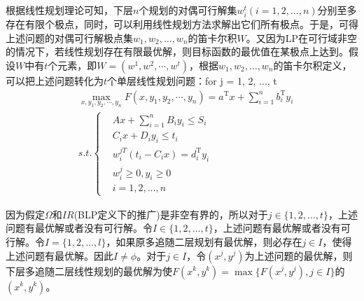     \par
    根据线性规划理论可知，下层$n$个规划的对偶可行解集$w_i^t (i=1,2,\ldots,n)$分别至多存在有限个极点，同时，可以利用线性规划方法求解出它们所有极点。于是，可得上述问题的对偶可行解极点集$w_1,w_2,\ldots,w_n$的笛卡尔积$W$。又因为LP在可行域非空的情况下，若线性规划存在有限最优解，则目标函数的最优值在某极点上达到。假设$W$中有$t$个元素，即$W=(w^1,w^2,\cdots,w^t )$，根据$w_1,w_2,\ldots,w_n$的笛卡尔积定义，可以把上述问题转化为$t$个单层线性规划问题：for j = 1, 2, ..., t
    \begin{align*}
        &\mathop{\max}\limits_{x,y_1,y_2,\cdots,y_n} F(x,y_1,y_2,\cdots,y_n)=a^\mathrm{T} x+\mathop{\sum}\limits_{i=1}^nb_i^\mathrm{T} y_i\\
        & s.t.\left\{
        \begin{aligned}
        & Ax+\mathop{\sum}\limits_{i=1}^nB_iy_i\leqslant S_i\\
        & C_ix+D_iy_i\leqslant t_i\\
        & w_i^{jT}(t_i-C_ix) = d_i^\mathrm{T} y_i\\
        & w_i^j \geqslant 0,y_i \geqslant 0\\
        & i=1,2,\ldots,n
        \end{aligned}
            \right.
    \end{align*}
    \par
    因为假定$\Omega$和$IR$(BLP定义下的推广)是非空有界的，所以对于$j\in \{1,2,\ldots,t\}$，上述问题有最优解或者没有可行解。令$I\in \{1,2,\ldots ,t\}$，上述问题有最优解或者没有可行解。令$I=\{1,2,\ldots ,l\}$，如果原多追随二层规划有最优解，则必存在$j \in I$，使得上述问题有最优解。因此$I\neq \phi$。对于$j \in I$，令$(x^j,y^j)$为上述问题的最优解，则下层多追随二层线性规划的最优解为使$F(x^k,y^k)=\max\{F(x^j,y^j),j \in I\}$的$(x^k,y^k)$。
